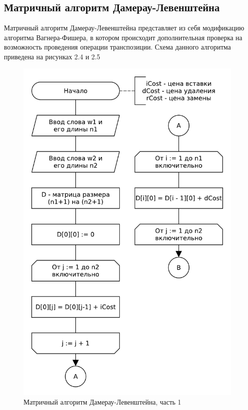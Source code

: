 \subsection{Матричный алгоритм Дамерау-Левенштейна}
Матричный алгоритм Дамерау-Левенштейна представляет из себя модификацию алгоритма Вагнера-Фишера, в котором происходит дополнительная проверка на возможность проведения операции транспозиции. Схема данного алгоритма приведена на рисунках 2.4 и 2.5
\begin{figure}[H]
    \centering
    \includegraphics[scale=0.75]{pdf/damerau-levenshteain-part1.pdf}
    \caption{Матричный алгоритм Дамерау-Левенштейна, часть 1}
\end{figure}
